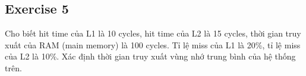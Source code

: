 \subsection{Exercise 5}
Cho biết hit time của L1 là 10 cycles, hit time của L2 là 15 cycles, thời gian truy xuất của RAM (main memory) là 100 cycles. Tỉ lệ miss của L1 là 20\%, tỉ lệ miss của L2 là 10\%.
Xác định thời gian truy xuất vùng nhớ trung bình của hệ thống trên.

